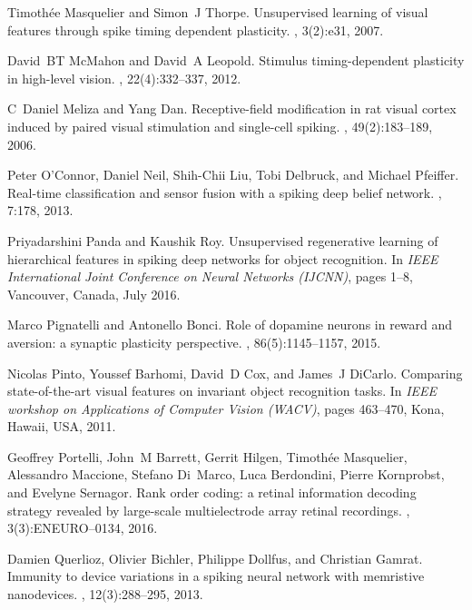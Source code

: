 \documentclass[preprint,5p,12pt,twocolumn]{article}
\begin{document}
\begin{thebibliography}{10}
Timoth{\'e}e Masquelier and Simon~J Thorpe.
\newblock Unsupervised learning of visual features through spike timing
  dependent plasticity.
, 3(2):e31, 2007.

David~BT McMahon and David~A Leopold.
\newblock Stimulus timing-dependent plasticity in high-level vision.
, 22(4):332--337, 2012.

C~Daniel Meliza and Yang Dan.
\newblock Receptive-field modification in rat visual cortex induced by paired
  visual stimulation and single-cell spiking.
, 49(2):183--189, 2006.

Peter O'Connor, Daniel Neil, Shih-Chii Liu, Tobi Delbruck, and Michael
  Pfeiffer.
\newblock Real-time classification and sensor fusion with a spiking deep belief
  network.
, 7:178, 2013.

Priyadarshini Panda and Kaushik Roy.
\newblock Unsupervised regenerative learning of hierarchical features in
  spiking deep networks for object recognition.
\newblock In {\em IEEE International Joint Conference on Neural Networks
  (IJCNN)}, pages 1--8, Vancouver, Canada, July 2016.

Marco Pignatelli and Antonello Bonci.
\newblock Role of dopamine neurons in reward and aversion: a synaptic
  plasticity perspective.
, 86(5):1145--1157, 2015.

Nicolas Pinto, Youssef Barhomi, David~D Cox, and James~J DiCarlo.
\newblock Comparing state-of-the-art visual features on invariant object
  recognition tasks.
\newblock In {\em IEEE workshop on Applications of Computer Vision (WACV)},
  pages 463--470, Kona, Hawaii, USA, 2011.

Geoffrey Portelli, John~M Barrett, Gerrit Hilgen, Timoth{\'e}e Masquelier,
  Alessandro Maccione, Stefano Di~Marco, Luca Berdondini, Pierre Kornprobst,
  and Evelyne Sernagor.
\newblock Rank order coding: a retinal information decoding strategy revealed
  by large-scale multielectrode array retinal recordings.
, 3(3):ENEURO--0134, 2016.

Damien Querlioz, Olivier Bichler, Philippe Dollfus, and Christian Gamrat.
\newblock Immunity to device variations in a spiking neural network with
  memristive nanodevices.
, 12(3):288--295, 2013.


\end{thebibliography}
\end{document}
